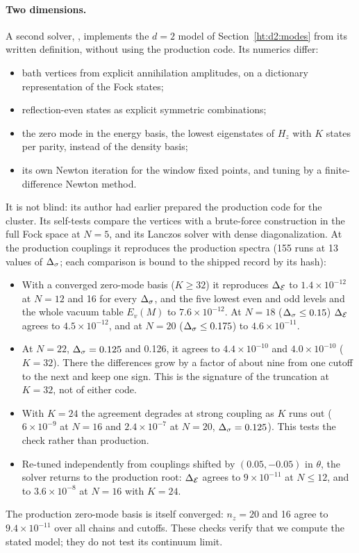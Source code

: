 \paragraph{Two dimensions.}\label{ht:d2:checks}
A second solver, , implements the $d=2$ model of Section~\ref{ht:d2:modes} from its written
definition, without using the production code. Its numerics differ:
\begin{itemize}
\item bath vertices from explicit annihilation amplitudes, on a dictionary representation of the Fock states;
\item reflection-even states as explicit symmetric combinations;
\item the zero mode in the energy basis, the lowest eigenstates of $H_z$ with $K$ states per parity, instead of the
 density basis;
\item its own Newton iteration for the window fixed points, and tuning by a finite-difference Newton method.
\end{itemize}
It is not blind: its author had earlier prepared the production code for the cluster. Its self-tests compare the
vertices with a brute-force construction in the full Fock space at $N=5$, and its Lanczos solver with dense
diagonalization. At the production couplings it reproduces the production spectra (155 runs at 13 values of $\Delta_\sigma$; each
comparison is bound to the shipped record by its hash):
\begin{itemize}
\item With a converged zero-mode basis ($K\ge32$) it reproduces $\Delta_{\mathcal E}$ to $1.4\times10^{-12}$ at $N=12$ and 16 for every
 $\Delta_\sigma$, and the five lowest even and odd levels and the whole vacuum table $E_v(M)$ to $7.6\times10^{-12}$. At $N=18$
 ($\Delta_\sigma\le0.15$) $\Delta_{\mathcal E}$ agrees to $4.5\times10^{-12}$, and at $N=20$ ($\Delta_\sigma\le0.175$) to $4.6\times10^{-11}$.
\item At $N=22$, $\Delta_\sigma=0.125$ and 0.126, it agrees to $4.4\times10^{-10}$ and $4.0\times10^{-10}$ ($K=32$). There the
 differences grow by a factor of about nine from one cutoff to the next and keep one sign. This is the signature of the
 truncation at $K=32$, not of either code.
\item With $K=24$ the agreement degrades at strong coupling as $K$ runs out ($6\times10^{-9}$ at $N=16$ and
 $2.4\times10^{-7}$ at $N=20$, $\Delta_\sigma=0.125$). This tests the check rather than production.
\item Re-tuned independently from couplings shifted by $(0.05,-0.05)$ in $\theta$, the solver returns to the production
 root: $\Delta_{\mathcal E}$ agrees to $9\times10^{-11}$ at $N\le12$, and to $3.6\times10^{-8}$ at $N=16$ with $K=24$.
\end{itemize}
The production zero-mode basis is itself converged: $n_z=20$ and 16 agree to $9.4\times10^{-11}$ over all chains and
cutoffs. These checks verify that we compute the stated model; they do not test its continuum limit.
